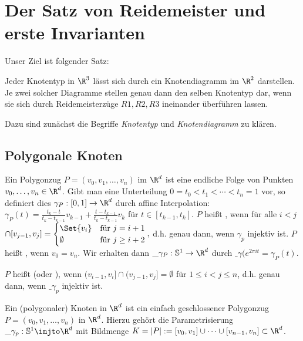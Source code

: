 \chapter{Der Satz von Reidemeister und erste Invarianten}


Unser Ziel ist folgender Satz:
\begin{st}
    Jeder Knotentyp in $\R^3$ lässt sich durch ein Knotendiagramm im $\R^2$ darstellen.
    Je zwei solcher Diagramme stellen genau dann den selben Knotentyp dar, wenn sie sich durch Reidemeisterzüge $R1, R2, R3$ ineinander überführen lassen.
\end{st}
Dazu sind zunächst die Begriffe \emph{Knotentyp} und \emph{Knotendiagramm} zu klären.

\section{Polygonale Knoten}

Ein Polygonzug $P = (v_0, v_1, \dotsc, v_n)$ im $\R^d$ ist eine endliche Folge von Punkten $v_0, \dotsc, v_n \in \R^d$. 
Gibt man eine Unterteilung $0 = t_0 < t_1 < \dotsb < t_n = 1$ vor, so definiert dies $\gamma_P: [0,1] \to \R^d$ durch affine Interpolation:
\begin{math}
    \gamma_P(t) = \frac{t_k - t}{t_k - t_{k-1}} v_{k-1} + \frac{t-t_{k-1}}{t_k -t_{k-1}} v_k
\end{math}
für $t \in [t_{k-1}, t_k]$.
$P$ heißt , wenn für alle $i < j$
\begin{math}
    [v_{i-1}, v_i] \cap [v_{j-1}, v_j]
    = \begin{cases}
        \Set{v_i} & \text{für $j = i + 1$} \\
        \emptyset & \text{für $j \ge i + 2$}
    \end{cases},
\end{math}
d.h. genau dann, wenn $\gamma_p$ injektiv ist.
$P$ heißt , wenn $v_0 = v_n$.
Wir erhalten dann $\_\gamma_P: \S^1 \to \R^d$ durch $\_\gamma(e^{2\pi i t} = \gamma_P(t)$.

$P$ heißt  (oder ), wenn
\begin{math}
    (v_{i-1}, v_i] \cap ( v_{j-1}, v_j] = \emptyset
\end{math}
für $1 \le i < j \le n$, d.h. genau dann, wenn $\_\gamma_p$ injektiv ist.

\begin{df}
    Ein (polygonaler) Knoten in $\R^d$ ist ein einfach geschlossener Polygonzug $P = (v_0, v_1, \dotsc, v_n)$ in $\R^d$.
    Hierzu gehört die Parametrisierung $\_\gamma_p: \S^1 \injto \R^d$ mit Bildmenge $K = |P| := [v_0, v_1] \cup \dotsb \cup [v_{n-1},v_n] \subset \R^d$.
\end{df}

